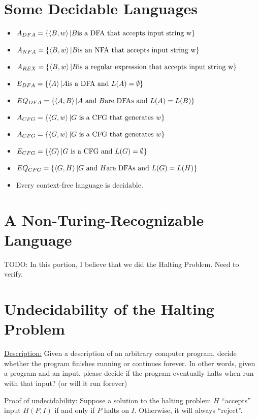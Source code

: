     \section{Some Decidable Languages}
        \begin{itemize}
            \item $A_{DFA} = \{ \left \langle B, w \right \rangle  | B \text{is a DFA that accepts input string w} \}$
            \item $A_{NFA} = \{ \left \langle B, w \right \rangle  | B \text{is an NFA that accepts input string w} \}$
            \item $A_{REX} = \{ \left \langle B, w \right \rangle  | B \text{is a regular expression that accepts input string w} \}$
            \item $E_{DFA} = \{ \left \langle A \right \rangle  | A \text{is a DFA and } L(A) = \emptyset \}$
            \item $EQ_{DFA} = \{ \left \langle A, B \right \rangle  | A \text{ and } B \text{are DFAs and } L(A) = L(B) \}$
            \item $A_{CFG} = \{ \left \langle G, w \right \rangle  | G \text{ is a CFG that generates } w \}$
            \item $A_{CFG} = \{ \left \langle G, w \right \rangle  | G \text{ is a CFG that generates } w \}$
            \item $E_{CFG} = \{ \left \langle G \right \rangle  | G \text{ is a CFG and } L(G) = \emptyset \}$
            \item $EQ_{CFG} = \{ \left \langle G, H \right \rangle  | G \text{ and } H \text{are DFAs and } L(G) = L(H) \}$
            \item Every context-free language is decidable.
        \end{itemize}
    \section{A Non-Turing-Recognizable Language}
        TODO: In this portion, I believe that we did the Halting Problem. Need
        to verify.
    \section{Undecidability of the Halting Problem}
        \uline{Description:}
        Given a description of an arbitrary computer program, decide whether the
        program finishes running or continues forever.
        In other words, given a program and an input, please decide if the
        program eventually halts when run with that input? (or will it run
        forever)

        \uline{Proof of undecidability:}
        Suppose a solution to the halting problem $H$ ``accepts'' input
        $H(P, I)$ if and only if $P$ halts on $I$. Otherwise, it will always
        ``reject''.

